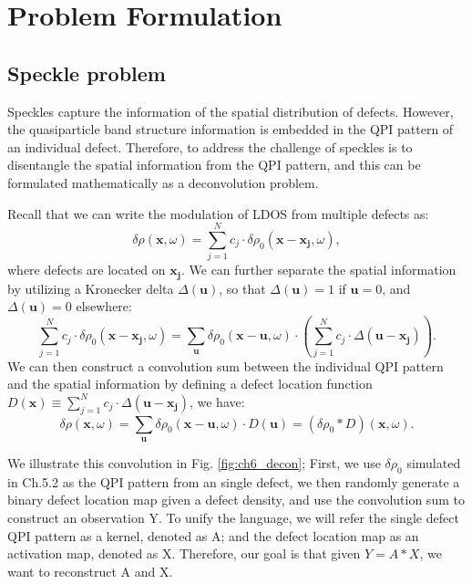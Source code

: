 \section{Problem Formulation}
\subsection{Speckle problem}
Speckles capture the information of the spatial distribution of defects. However, the quasiparticle band structure information is embedded in the \ac{QPI} pattern of an individual defect. Therefore, to address the challenge of speckles is to disentangle the spatial information from the \ac{QPI} pattern, and this can be formulated mathematically as a deconvolution problem. 
\par \noindent Recall that we can write the modulation of \ac{LDOS} from multiple defects as:
\begin{equation}
	\delta \rho(\mathbf{x}, \omega) = \sum_{j=1}^{N}c_j \cdot \delta \rho_0(\mathbf{x}-\mathbf{x_j},\omega),
\end{equation}
\noindent where defects are located on $\mathbf{x_j}$. We can further separate the spatial information by utilizing a Kronecker delta $\Delta(\mathbf{u})$, so that $\Delta(\mathbf{u})=1$ if $\mathbf{u} = 0$, and $\Delta(\mathbf{u})=0$ elsewhere: 
\begin{equation}
	\sum_{j=1}^{N}c_j \cdot \delta \rho_0(\mathbf{x}-\mathbf{x_j},\omega) = \sum_{\mathbf{u}} \delta \rho_0(\mathbf{x}-\mathbf{u},\omega)\cdot(\sum_{j=1}^{N} c_j \cdot \Delta(\mathbf{u-x_j})).
\end{equation}
\noindent We can then construct a convolution sum between the individual \ac{QPI} pattern and the spatial information by defining a defect location function $D(\mathbf{x}) \equiv \sum_{j=1}^{N} c_j \cdot \Delta(\mathbf{u-x_j})$, we have: 
\begin{equation}
	\delta \rho(\mathbf{x}, \omega) =  \sum_{\mathbf{u}} \delta \rho_0(\mathbf{x}-\mathbf{u},\omega)\cdot D(\mathbf{u}) = (\delta \rho_0 *D)(\mathbf{x}, \omega).
\end{equation}

We illustrate this convolution in Fig. \ref{fig:ch6_decon}; First, we use $\delta \rho_0$ simulated in Ch.5.2 as the \ac{QPI} pattern from an single defect, we then randomly generate a binary defect location map given a defect density, and use the convolution sum to construct an observation Y. To unify the language, we will refer the single defect \ac{QPI} pattern as a kernel, denoted as A; and the defect location map as an activation map, denoted as X. Therefore, our goal is that given $Y = A * X$, we want to reconstruct A and X. 

